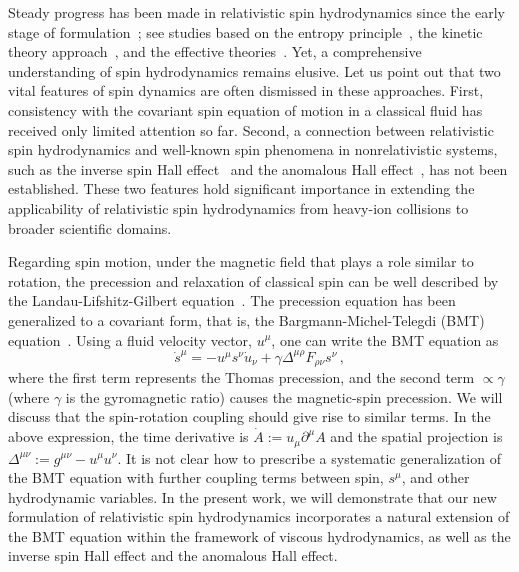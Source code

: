 \documentclass[prl,superscriptaddress,twocolumn,
  showpacs,preprintnumbers,amsmath,amssymb]{revtex4-1}
\begin{document}
Steady progress has been made in relativistic spin hydrodynamics since the early stage of formulation~\cite{Becattini:2009wh,Florkowski:2017ruc}; see studies based on the entropy principle~\cite{Hattori:2019lfp,Fukushima:2020ucl,Li:2020eon}, the kinetic theory approach~\cite{Florkowski:2018fap,Weickgenannt:2022zxs}, and the effective theories~\cite{Montenegro:2017rbu}.  Yet, a comprehensive understanding of spin hydrodynamics remains elusive.  Let us point out that two vital features of spin dynamics are often dismissed in these approaches.  First, consistency with the covariant spin equation of motion in a classical fluid has received only limited attention so far.  Second, a connection between relativistic spin hydrodynamics and well-known spin phenomena in nonrelativistic systems, such as  the inverse spin Hall effect~\cite{sinova2015spin} and the anomalous Hall effect~\cite{Xiao:2009rm,nagaosa2010anomalous}, has not been established.  These two features hold significant importance in extending the applicability of relativistic spin hydrodynamics from heavy-ion collisions to broader scientific domains.

Regarding spin motion, under the magnetic field that plays a role similar to rotation, the precession and relaxation of classical spin can be well described by the Landau-Lifshitz-Gilbert equation~\cite{lakshmanan2011fascinating}.  The precession equation has been generalized to a covariant form, that is, the Bargmann-Michel-Telegdi (BMT) equation~\cite{Jackson:1998nia}.  Using a fluid velocity vector, $u^\mu$, one can write the BMT equation as
\begin{equation}
    \dot{s}^\mu = -u^\mu s^\nu \dot{u}_\nu
    + \gamma \Delta^{\mu\rho} F_{\rho\nu} s^\nu \,,
    \label{eq:BMT}
\end{equation}
where the first term represents the Thomas precession, and the second term $\propto\gamma$ (where $\gamma$ is the gyromagnetic ratio) causes the magnetic-spin precession.  We will discuss that the spin-rotation coupling should give rise to similar terms.  In the above expression, the time derivative is $\dot{A}:=u_\mu \partial^\mu A$ and the spatial projection is $\Delta^{\mu\nu}:=g^{\mu\nu}-u^\mu u^\nu$.  It is not clear how to prescribe a systematic generalization of the BMT equation with further coupling terms between spin, $s^\mu$, and other hydrodynamic variables.  In the present work, we will demonstrate that our new formulation of relativistic spin hydrodynamics incorporates a natural extension of the BMT equation within the framework of viscous hydrodynamics, as well as the inverse spin Hall effect and the anomalous Hall effect.
\end{document}
